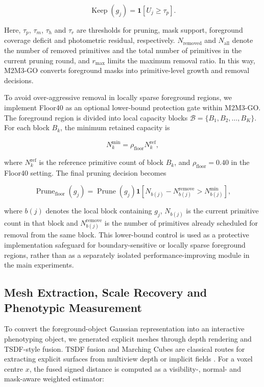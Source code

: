 \documentclass[a4paper]{cas-sc}
\begin{document}
\[
\operatorname{Keep}(g_j)=
\mathbf{1}\left[U_j\geq \tau_p\right].
\]

Here, \(\tau_p\), \(\tau_m\), \(\tau_h\) and \(\tau_r\) are thresholds for pruning, mask support, foreground coverage deficit and photometric residual, respectively. \(N_{\text{removed}}\) and \(N_{\text{all}}\) denote the number of removed primitives and the total number of primitives in the current pruning round, and \(r_{\max}\) limits the maximum removal ratio. In this way, M2M3-GO converts foreground masks into primitive-level growth and removal decisions.

To avoid over-aggressive removal in locally sparse foreground regions, we implement Floor40 as an optional lower-bound protection gate within M2M3-GO. The foreground region is divided into local capacity blocks \(\mathcal{B}=\{B_1,B_2,\ldots,B_K\}\). For each block \(B_k\), the minimum retained capacity is

\[
N_k^{\min}=\rho_{\text{floor}}N_k^{\text{ref}},
\]

where \(N_k^{\text{ref}}\) is the reference primitive count of block \(B_k\), and \(\rho_{\text{floor}}=0.40\) in the Floor40 setting. The final pruning decision becomes

\[
\operatorname{Prune}_{\text{floor}}(g_j)=
\operatorname{Prune}(g_j)
\mathbf{1}
\left[
N_{b(j)}-N_{b(j)}^{\text{remove}}>N_{b(j)}^{\min}
\right],
\]

where \(b(j)\) denotes the local block containing \(g_j\), \(N_{b(j)}\) is the current primitive count in that block and \(N_{b(j)}^{\text{remove}}\) is the number of primitives already scheduled for removal from the same block. This lower-bound control is used as a protective implementation safeguard for boundary-sensitive or locally sparse foreground regions, rather than as a separately isolated performance-improving module in the main experiments.


\subsection{Mesh Extraction, Scale Recovery and Phenotypic Measurement}\label{sec:mesh-extraction-scale-recovery-and-pheno}

To convert the foreground-object Gaussian representation into an interactive phenotyping object, we generated explicit meshes through depth rendering and TSDF-style fusion. TSDF fusion and Marching Cubes are classical routes for extracting explicit surfaces from multiview depth or implicit fields \cite{ref45,ref46}. For a voxel centre \(x\), the fused signed distance is computed as a visibility-, normal- and mask-aware weighted estimator:
\end{document}

